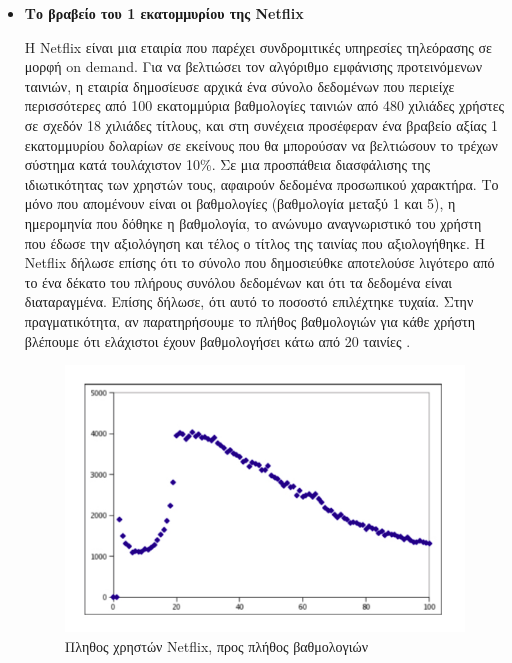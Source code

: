 \begin{itemize}
\item \textbf{Το βραβείο του 1 εκατομμυρίου της  \textlatin{Netflix}}

Η \textlatin{Netflix} είναι μια εταιρία που παρέχει συνδρομιτικές υπηρεσίες τηλεόρασης σε μορφή \textlatin{on demand}. Για να βελτιώσει τον αλγόριθμο εμφάνισης προτεινόμενων ταινιών, η εταιρία δημοσίευσε αρχικά ένα σύνολο δεδομένων που περιείχε περισσότερες από 100 εκατομμύρια βαθμολογίες ταινιών από 480 χιλιάδες χρήστες σε σχεδόν 18 χιλιάδες τίτλους, και στη συνέχεια προσέφεραν ένα βραβείο αξίας 1 εκατομμυρίου δολαρίων σε εκείνους που θα μπορούσαν να βελτιώσουν το τρέχων σύστημα κατά τουλάχιστον 10\%.
Σε μια προσπάθεια διασφάλισης της ιδιωτικότητας των χρηστών τους, αφαιρούν δεδομένα προσωπικού χαρακτήρα.
Το μόνο που απομένουν είναι οι βαθμολογίες (βαθμολογία μεταξύ 1 και 5), η ημερομηνία που δόθηκε η βαθμολογία, το ανώνυμο αναγνωριστικό του χρήστη που έδωσε την αξιολόγηση και τέλος ο τίτλος της ταινίας που αξιολογήθηκε.
Η \textlatin{Netflix} δήλωσε επίσης ότι το σύνολο που δημοσιεύθκε αποτελούσε λιγότερο από το ένα δέκατο του πλήρους συνόλου δεδομένων και ότι τα δεδομένα είναι διαταραγμένα. 
Επίσης δήλωσε, ότι αυτό το ποσοστό επιλέχτηκε τυχαία.
Στην πραγματικότητα, αν παρατηρήσουμε το πλήθος βαθμολογιών για κάθε χρήστη βλέπουμε ότι ελάχιστοι έχουν βαθμολογήσει κάτω από 20 ταινίες \textlatin{\cite{Narayanan:2008:RDL:1397759.1398064}}. 

\begin{figure} [h!]
\begin{center}
  \includegraphics[scale=0.6]{images/Netflix.jpg}
  \caption{Πληθος χρηστών \textlatin{Netflix}, προς πλήθος βαθμολογιών}
  \end{center}
\end{figure}


\end{itemize}
